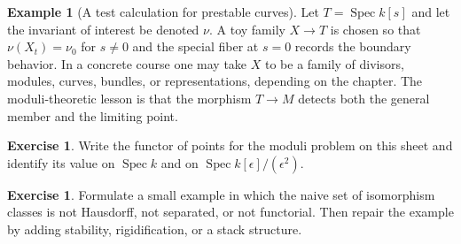 \documentclass[11pt]{amsart}
\theoremstyle{definition}
\newtheorem{example}[theorem]{Example}
\newtheorem{exercise}[theorem]{Exercise}
\newcommand{\Spec}{\operatorname{Spec}}
\begin{document}
\begin{example}[A test calculation for prestable curves]
Let $T=\Spec k[s]$ and let the invariant of interest be denoted $\nu$.  A toy family $X\to T$ is chosen so that $\nu(X_t)=\nu_0$ for $s\ne0$ and the special fiber at $s=0$ records the boundary behavior.  In a concrete course one may take $X$ to be a family of divisors, modules, curves, bundles, or representations, depending on the chapter.  The moduli-theoretic lesson is that the morphism $T\to M$ detects both the general member and the limiting point.
\end{example}
\begin{exercise}
Write the functor of points for the moduli problem on this sheet and identify its value on $\Spec k$ and on $\Spec k[\epsilon]/(\epsilon^2)$.
\end{exercise}
\begin{exercise}
Formulate a small example in which the naive set of isomorphism classes is not Hausdorff, not separated, or not functorial.  Then repair the example by adding stability, rigidification, or a stack structure.
\end{exercise}
\clearpage
\end{document}
